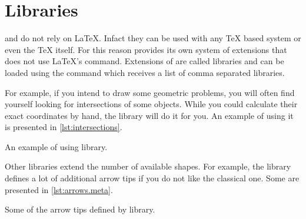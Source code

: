 \section{Libraries}

 and \TikZ{} do not rely on \LaTeX{}. Infact they can be used with
any \TeX{} based system or even the \TeX{} itself. For this reason \TikZ{}
provides its own system of extensions that does not use \LaTeX{}'s
 command. Extensions of \TikZ{} are called libraries and can be
loaded using the  command which receives a list of comma
separated libraries.

For example, if you intend to draw some geometric problems, you will often find
yourself looking for intersections of some objects. While you could calculate
their exact coordinates by hand, the  library will do it
for you. An example of using it is presented in \autoref{lst:intersections}.

\begin{listing}
  \begin{example}[vertical_mode, examplewidth=0.8\linewidth]
\usetikzlibrary{intersections}

\end{example}
  \caption{An example of using 
    library.}\label{lst:intersections}
\end{listing}

Other libraries extend the number of available shapes. For example, the
 library defines a lot of additional arrow tips if you do
not like the classical one. Some are presented in
\autoref{lst:arrows.meta}.

\begin{listing}
  \begin{example}[vertical_mode, examplewidth=0.8\linewidth]
\usetikzlibrary{arrows.meta}

\end{example}
  \caption{Some of the arrow tips defined by 
    library.}\label{lst:arrows.meta}
\end{listing}

